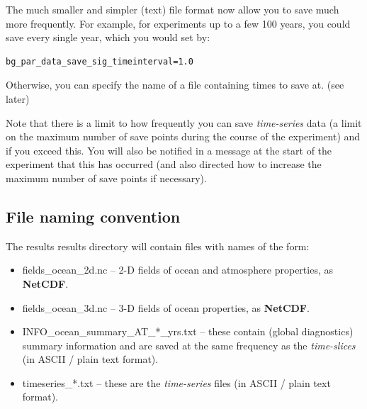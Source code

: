 The much smaller and simpler (text) file format now allow you to save much more frequently. For example, for experiments up to a few 100 years, you could save every single year, which you would set by:

\vspace{-1mm}\small\begin{verbatim}
bg_par_data_save_sig_timeinterval=1.0
\end{verbatim}\normalsize\vspace{-1mm}

\noindent Otherwise, you can specify the name of a file containing times to save at. (see later)

\vspace{1mm}
Note that there is a limit to how frequently you can save \textit{time-series} data (a limit on the maximum number of save points during the course of the experiment) and if you exceed this. You will also be notified in a message at the start of the experiment that this has occurred (and also directed how to increase the maximum number of save points if necessary).


\subsection{File naming convention}

The \textsf{\footnotesize results} results directory will contain files with names of the form:

\vspace{1mm}
\begin{itemize}[noitemsep]
\setlength{\itemindent}{.2in}
\item \textsf{\footnotesize fields\_ocean\_2d.nc} – 2-D fields of ocean and atmosphere properties, as \textbf{NetCDF}.
\item \textsf{\footnotesize fields\_ocean\_3d.nc} – 3-D fields of ocean properties, as \textbf{NetCDF}.
\item \textsf{\footnotesize INFO\_ocean\_summary\_AT\_*\_yrs.txt} – these contain (global diagnostics) summary information and are saved at the same frequency as the \textit{time-slices} (in ASCII / plain text format).
\item \textsf{\footnotesize timeseries\_*.txt} – these are the \textit{time-series} files (in ASCII / plain text format).
\end{itemize}
\vspace{1mm}

